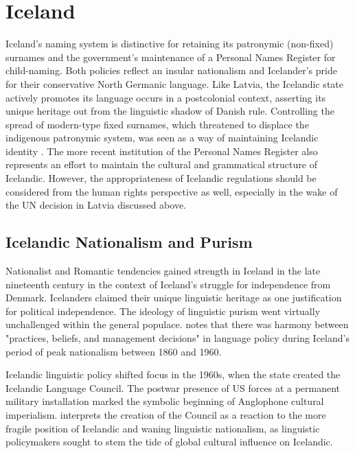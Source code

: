 \section{Iceland}

Iceland's naming system is distinctive for retaining its patronymic (non-fixed)
surnames and the government's maintenance of a Personal Names Register for
child-naming. Both policies reflect an insular nationalism and Icelander's
pride for their conservative North Germanic language. Like Latvia, the
Icelandic state actively promotes its language occurs in a postcolonial
context, asserting its unique heritage out from the linguistic shadow of Danish
rule. Controlling the spread of modern-type fixed surnames, which threatened to
displace the indigenous patronymic system, was seen as a way of maintaining
Icelandic identity \parencite{willson02}. The more recent institution of the
Personal Names Register also represents an effort to maintain the cultural and
grammatical structure of Icelandic. However, the appropriateness of Icelandic
regulations should be considered from the human rights perspective as well,
especially in the wake of the UN decision in Latvia discussed above.

\subsection{Icelandic Nationalism and Purism}

Nationalist and Romantic tendencies gained strength in Iceland in the late
nineteenth century in the context of Iceland's struggle for independence from
Denmark. Icelanders claimed their unique linguistic heritage as one
justification for political independence. The ideology of linguistic purism
went virtually unchallenged within the general populace.
\textcite{kristinsson12} notes that there was harmony between "practices,
beliefs, and management decisions" in language policy during Iceland's period
of peak nationalism between 1860 and 1960.

Icelandic linguistic policy shifted focus in the 1960s, when the state created
the Icelandic Language Council. The postwar presence of US forces at a
permanent military installation marked the symbolic beginning of Anglophone
cultural imperialism. \textcite{kristinsson12} interprets the creation of the
Council as a reaction to the more fragile position of Icelandic and waning
linguistic nationalism, as linguistic policymakers sought to stem the tide of
global cultural influence on Icelandic.

